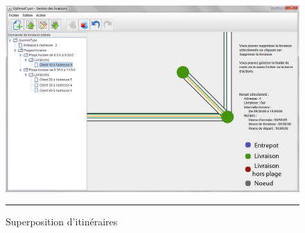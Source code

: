\begin{figure}[H]
	\centering
		\includegraphics[width=\textwidth,height=\textheight,keepaspectratio]{Figures/path}
		\rule{35em}{0.5pt}
	\caption[Superposition d'itinéraires]{Superposition d'itinéraires}
\end{figure}